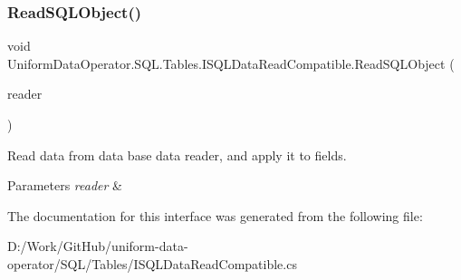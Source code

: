 \subsubsection{\texorpdfstring{Read\+S\+Q\+L\+Object()}{ReadSQLObject()}}
{\footnotesize\ttfamily void Uniform\+Data\+Operator.\+S\+Q\+L.\+Tables.\+I\+S\+Q\+L\+Data\+Read\+Compatible.\+Read\+S\+Q\+L\+Object (\begin{DoxyParamCaption}\item[{Db\+Data\+Reader}]{reader }\end{DoxyParamCaption})}



Read data from data base data reader, and apply it to fields. 


\begin{DoxyParams}{Parameters}
{\em reader} & \\
\hline
\end{DoxyParams}


The documentation for this interface was generated from the following file\+:\begin{DoxyCompactItemize}
\item 
D\+:/\+Work/\+Git\+Hub/uniform-\/data-\/operator/\+S\+Q\+L/\+Tables/I\+S\+Q\+L\+Data\+Read\+Compatible.\+cs\end{DoxyCompactItemize}
